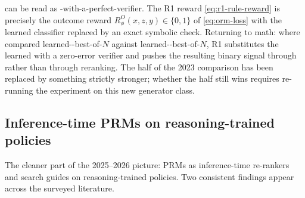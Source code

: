 \begin{intuition}
 can be read as -with-a-perfect-verifier. The R1 reward
\cref{eq:r1-rule-reward} is precisely the outcome reward
$R^O_\phi(x, z, y) \in \{0, 1\}$ of \cref{eq:orm-loss} with the learned
classifier replaced by an exact symbolic check. Returning to math:
where \citet{lightman2023-prm800k} compared learned--best-of-$N$
against learned--best-of-$N$, R1 substitutes the learned  with a
zero-error verifier and pushes the resulting binary signal through 
rather than through reranking. The  half of the 2023 comparison has
been replaced by something strictly stronger; whether the  half
still wins requires re-running the experiment on this new generator
class.
\end{intuition}

\subsection{Inference-time PRMs on reasoning-trained policies}
\label{sec:prm-survival-inference}

The cleaner part of the 2025--2026 picture: PRMs as inference-time
re-rankers and search guides on reasoning-trained policies. Two
consistent findings appear across the surveyed literature.

